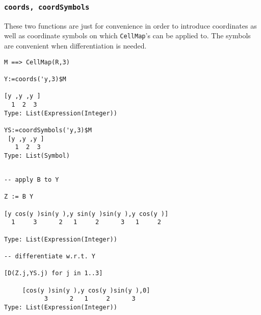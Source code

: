 \documentclass[12pt,a4paper]{article}
\begin{document}
\subsubsection{{\tt coords, coordSymbols}}
These two functions are just for convenience in order to introduce
coordinates as well as coordinate symbols on which {\tt CellMap}'s 
can be applied to. The symbols are convenient when differentiation
is needed.
\begin{lstlisting}
M ==> CellMap(R,3) 

Y:=coords('y,3)$M

[y ,y ,y ]
  1  2  3
Type: List(Expression(Integer))

YS:=coordSymbols('y,3)$M
 [y ,y ,y ]
   1  2  3
Type: List(Symbol)
\end{lstlisting}
\scriptsize
\begin{verbatim}

-- apply B to Y

Z := B Y

[y cos(y )sin(y ),y sin(y )sin(y ),y cos(y )]
  1     3      2   1     2      3   1     2

Type: List(Expression(Integer))

-- differentiate w.r.t. Y

[D(Z.j,YS.j) for j in 1..3]

     [cos(y )sin(y ),y cos(y )sin(y ),0]
           3      2   1     2      3     
Type: List(Expression(Integer))
\end{verbatim}
\normalsize
%
\end{document}
